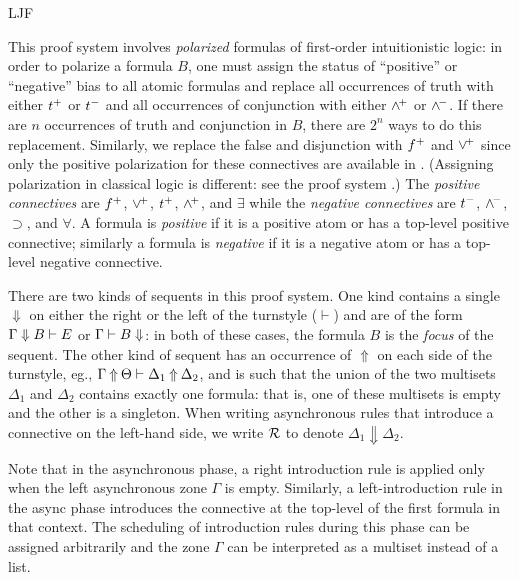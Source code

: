 \begin{entry}{LJF}
\begin{clarifications}
This proof system involves \emph{polarized} formulas of first-order
intuitionistic logic: in order to polarize a formula $B$, one must
assign the status of ``positive'' or ``negative'' bias to all atomic
formulas and replace all occurrences of truth with either $t^+$ or
$t^-$ and all occurrences of conjunction with either $\wedge^{\!+}$ or
$\wedge^{\!-}$.  If there are $n$ occurrences of truth and conjunction in
$B$, there are $2^n$ ways to do this replacement.  Similarly, we
replace the false and disjunction with $f^+$ and $\vee^{\!+}$ since
only the positive polarization for these connectives are available in
\LJF.  (Assigning polarization in classical logic is different: see
the \LKF proof system .) 
The \emph{positive connectives} are $f^+$, $\vee^{\!+}$, $t^+$,
$\wedge^{\!+}$, and $\exists$ while the \emph{negative connectives} are
$t^-$, $\wedge^{\!-}$, $\supset$, and $\forall$.
A formula is \emph{positive} if it is a positive atom or has a top-level
positive connective; similarly a formula is \emph{negative} if it is a
negative atom or has a top-level negative connective.

There are two kinds of sequents in this proof system. 
%
One kind contains a single $\Downarrow$ on either
the right or the left of the turnstyle ($\vdash$) and are of
the form $\Gamma\Downarrow B\vdash E$ or $\Gamma\vdash B\Downarrow$: in both of these
cases, the formula $B$ 
is the \emph{focus} of the sequent.
%
The other kind of sequent has an occurrence of $\Uparrow$ on each side
of the turnstyle, eg., $\Gamma\mathbin\Uparrow\Theta\vdash\Delta_1\mathbin\Uparrow \Delta_2$, 
and is such that the union of the two multisets $\Delta_1$ and
$\Delta_2$ contains exactly one formula: that is, one of these
multisets is empty and the other is a singleton. 
%
When writing asynchronous rules that introduce a connective on the
left-hand side, we write ${\cal R}$ to denote
$\Delta_1\Downarrow\Delta_2$.

Note that in the asynchronous phase, a right introduction rule is
applied only when the left asynchronous zone $\Gamma$ is empty.
Similarly, a left-introduction rule in the async phase introduces the
connective at the top-level of the first formula in that context.  The
scheduling of introduction rules during this phase can be assigned
arbitrarily and the zone $\Gamma$ can be interpreted as a multiset
instead of a list.


\end{clarifications}
\end{entry}
